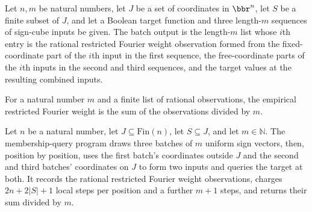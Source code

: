 \begin{theorem}
\label{FABL.restrictedFourierWeightObservationBatchOutput_eq_ofFn}
\leanok
{}
Let $n,m$ be natural numbers, let $J$ be a set of coordinates in $\bbr^n$, let $S$ be a
finite subset of $J$, and let a Boolean target function and three length-$m$ sequences
of sign-cube inputs be given. The batch output is the length-$m$ list whose $i$th entry
is the rational restricted Fourier weight observation formed from the fixed-coordinate
part of the $i$th input in the first sequence, the free-coordinate parts of the $i$th
inputs in the second and third sequences, and the target values at the resulting
combined inputs.
\end{theorem}

\begin{definition}
\label{FABL.empiricalRestrictedFourierWeight}
\leanok
For a natural number $m$ and a finite list of rational observations, the empirical
restricted Fourier weight is the sum of the observations divided by $m$.
\end{definition}

\begin{definition}
\label{FABL.restrictedFourierWeightEstimatorProgram}
\leanok
{}
Let $n$ be a natural number, let $J\subseteq\mathrm{Fin}(n)$, let $S\subseteq J$, and
let $m\in\mathbb N$. The membership-query program draws three batches of $m$ uniform
sign vectors, then, position by position, uses the first batch's coordinates outside $J$
and the second and third batches' coordinates on $J$ to form two inputs and queries the
target at both. It records the rational restricted Fourier weight observations, charges
$2n+2|S|+1$ local steps per position and a further $m+1$ steps, and returns their sum
divided by $m$.
\end{definition}

